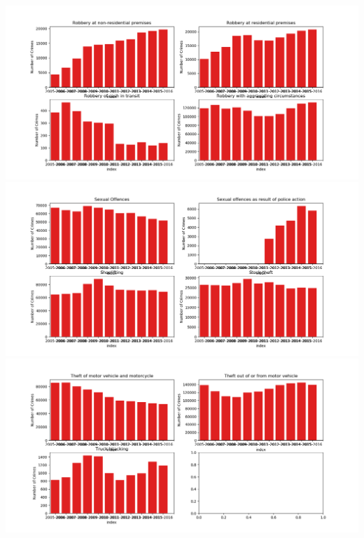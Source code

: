\documentclass[landscape,17pt]{extarticle}
\begin{document}
\includegraphics[width=\textwidth]{Figure_5.png}
\includegraphics[width=\textwidth]{Figure_6.png}
\includegraphics[width=\textwidth]{Catoegory/Figure_7.png}
\end{document}
